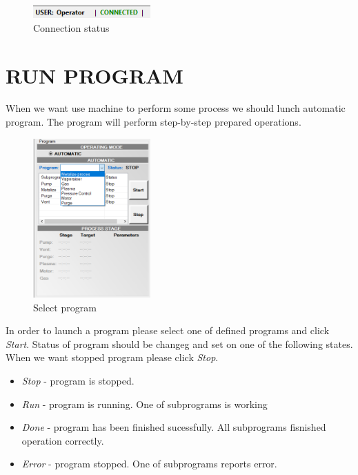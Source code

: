 	\begin{figure}[!h] 
	\centering \includegraphics[width=0.4\textwidth]{Graphic/StartWorking/ConnectionStatus.png}	
	\caption{Connection status}
	\label{connection_status}
	\end{figure}
	\FloatBarrier


\section {RUN PROGRAM}

When we want use machine to perform some process we should lunch automatic program. The program will perform step-by-step prepared operations. 

	\begin{figure}[!h] 
	\centering \includegraphics[width=0.4\textwidth]{Graphic/StartWorking/SelectProgram.png}	
	\caption{Select program}
	\label{select_program}
	\end{figure}
	\FloatBarrier

In order to launch a program please select one of defined programs and click \textit{Start}. Status of program should be changeg and set on one of the following states. When we want stopped program please click \textit{Stop}.

\begin{itemize}
	\item \textit{ Stop} - program is stopped. 
	\item \textit{ Run} - program is running. One of subprograms is working
	\item \textit{Done} - program has been finished sucessfully. All subprograms fisnished operation correctly.
	\item \textit{Error} - program stopped. One of subprograms reports error.
\end{itemize}

